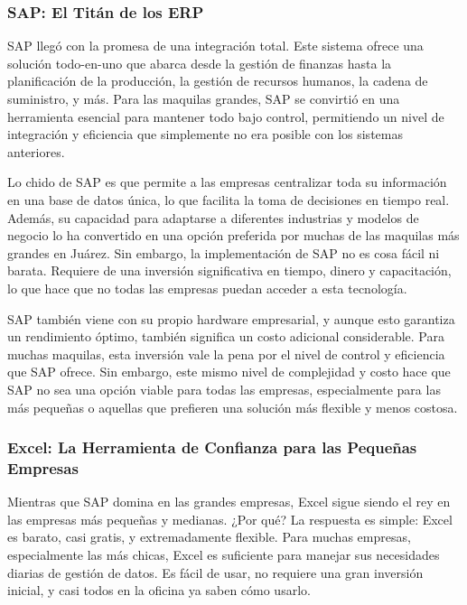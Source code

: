 \documentclass[
  10pt,
  letterpaper,
]{book}
\begin{document}
\subsubsection{SAP: El Titán de los
ERP}\label{sap-el-tituxe1n-de-los-erp}

SAP llegó con la promesa de una integración total. Este sistema ofrece
una solución todo-en-uno que abarca desde la gestión de finanzas hasta
la planificación de la producción, la gestión de recursos humanos, la
cadena de suministro, y más. Para las maquilas grandes, SAP se convirtió
en una herramienta esencial para mantener todo bajo control, permitiendo
un nivel de integración y eficiencia que simplemente no era posible con
los sistemas anteriores.

Lo chido de SAP es que permite a las empresas centralizar toda su
información en una base de datos única, lo que facilita la toma de
decisiones en tiempo real. Además, su capacidad para adaptarse a
diferentes industrias y modelos de negocio lo ha convertido en una
opción preferida por muchas de las maquilas más grandes en Juárez. Sin
embargo, la implementación de SAP no es cosa fácil ni barata. Requiere
de una inversión significativa en tiempo, dinero y capacitación, lo que
hace que no todas las empresas puedan acceder a esta tecnología.

SAP también viene con su propio hardware empresarial, y aunque esto
garantiza un rendimiento óptimo, también significa un costo adicional
considerable. Para muchas maquilas, esta inversión vale la pena por el
nivel de control y eficiencia que SAP ofrece. Sin embargo, este mismo
nivel de complejidad y costo hace que SAP no sea una opción viable para
todas las empresas, especialmente para las más pequeñas o aquellas que
prefieren una solución más flexible y menos costosa.

\subsubsection{Excel: La Herramienta de Confianza para las Pequeñas
Empresas}\label{excel-la-herramienta-de-confianza-para-las-pequeuxf1as-empresas}

Mientras que SAP domina en las grandes empresas, Excel sigue siendo el
rey en las empresas más pequeñas y medianas. ¿Por qué? La respuesta es
simple: Excel es barato, casi gratis, y extremadamente flexible. Para
muchas empresas, especialmente las más chicas, Excel es suficiente para
manejar sus necesidades diarias de gestión de datos. Es fácil de usar,
no requiere una gran inversión inicial, y casi todos en la oficina ya
saben cómo usarlo.
\end{document}
